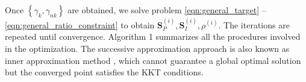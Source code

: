 Once $\left\{ {{\gamma _k},{\gamma _{nk}}} \right\}$ are obtained, we solve problem \ref{eqn:general_target} -- \ref{eqn:general_ratio_constraint} to obtain ${\mathbf{S}}_P^{(i)},{\mathbf{S}}_I^{(i)},{\rho ^{(i)}}$. The iterations are repeated until convergence. Algorithm 1 summarizes all the procedures involved in the optimization. The successive approximation approach is also known as inner approximation method \cite{Marks1978}, which cannot guarantee a global optimal solution but the converged point satisfies the KKT conditions.  
